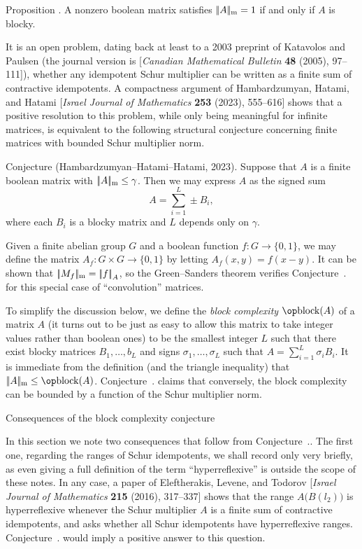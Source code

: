 \proclaim Proposition \advthm. A nonzero boolean matrix satisfies $|\!|A|\!|_{\rm m} = 1$ if and only if $A$
is blocky.

It is an open problem, dating back at least to a 2003 preprint of Katavolos and Paulsen
(the journal version is [{\sl Canadian Mathematical Bulletin} {\bf 48} (2005), 97--111]), whether
any idempotent Schur multiplier can be written as a finite sum of contractive idempotents.
A compactness argument of Hambardzumyan, Hatami, and Hatami
[{\sl Israel Journal of Mathematics} {\bf 253} (2023), 555--616]
shows that a positive resolution to this
problem, while only being meaningful for infinite matrices, is equivalent to the following
structural conjecture concerning finite matrices with bounded Schur multiplier norm.

\edef\conjHHH{\the\sectcount.\the\thmcount}
\parenproclaim Conjecture {\advthm} (Hambardzumyan--Hatami--Hatami, {\rm 2023}).
Suppose that $A$ is a finite boolean matrix with $|\!|A|\!|_{\rm m}\le \gamma$. Then we may express $A$ as
the signed sum
$$A = \sum_{i=1}^L \pm B_i,$$
where each $B_i$ is a blocky matrix and $L$ depends only on $\gamma$.

Given a finite abelian group $G$ and a boolean function $f:G\to\{0,1\}$, we may define the matrix
$A_f : G\times G\to \{0,1\}$ by letting $A_f(x,y) = f(x-y)$. It can be shown that
$|\!|M_f|\!|_{\rm m} = \left|\!\left|f\right|\!\right|_A$, so the Green--Sanders theorem verifies Conjecture~{\conjHHH}
for this special case of ``convolution'' matrices.

To simplify the discussion below, we define the {\it block complexity} $\block(A)$ of a
matrix $A$ (it turns out to be just as easy to allow this matrix to take integer values rather
than boolean ones) to be the smallest integer $L$ such that there exist blocky matrices
$B_1,\ldots,b_L$ and signs $\sigma_1,\ldots,\sigma_L$ such that $A = \sum_{i=1}^L \sigma_i B_i$.
It is immediate from the definition (and the triangle inequality) that $\normschur A\le \block(A)$.
Conjecture~{\conjHHH} claims that conversely, the block complexity can be bounded by a function
of the Schur multiplier norm.

\advsect Consequences of the block complexity conjecture

In this section we note two consequences that follow from Conjecture~{\conjHHH}. The first one,
regarding the ranges of Schur idempotents, we shall record only very briefly, as even giving a full
definition of the term ``hyperreflexive'' is outside the scope of these notes.
In any case, a paper of Eleftherakis, Levene, and Todorov
[{\sl Israel Journal of Mathematics} {\bf 215} (2016), 317--337] shows that the range
$A\bigl(B(l_2)\bigr)$ is hyperreflexive whenever the Schur multiplier $A$ is a
finite sum of contractive idempotents,
and asks whether all Schur idempotents have hyperreflexive ranges. Conjecture~{\conjHHH} would
imply a positive answer to this question.

